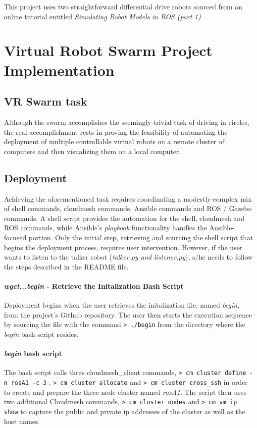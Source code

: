 \documentclass[9pt,twocolumn,twoside]{../../styles/osajnl}
\begin{document}
This project uses two straightforward differential drive robots sourced from an online tutorial entitled \textit{Simulating Robot Models in ROS (part 1)} \cite{www-mybot-moore}

\section{Virtual Robot Swarm Project Implementation}
\subsection{VR Swarm task}
Although the swarm accomplishes the seemingly-trivial task of driving in circles, the real accomplishment rests in proving the feasibility of automating the deployment of multiple controllable virtual robots on a remote cluster of computers and then visualizing them on a local computer.

\subsection{Deployment}
Achieving the aforementioned task requires coordinating a modestly-complex mix of shell commands, cloudmesh commands, Ansible commands and ROS / Gazebo commands. A shell script provides the automation for the shell, cloudmesh and ROS commands, while Ansible's \textit{playbook} functionality handles the Ansible-focused portion.  Only the initial step, retrieving and sourcing the shell script that begins the deployment process, requires user intervention.  However, if the user wants to listen to the talker robot (\textit{talker.py and listener.py}), s/he needs to follow the steps described in the README file.

\paragraph{\textit{wget...begin} - Retrieve the Initalization Bash Script}
Deployment begins when the user retrieves the initalization file, named \textit{begin}, from the project's Github repository.  The user then starts the execution sequence by sourcing the file with the command \newline
{\color{green} \lstinline[style=BashInputStyle]!> ./begin! } \newline
from the directory where the \textit{begin} bash script resides.  

\paragraph{\textit{begin} bash script}
The bash script calls three cloudmesh\_client commands, {\color{green} \lstinline[style=BashInputStyle]!> cm cluster define -n rosA1 -c 3! }, {\color{green} \lstinline[style=BashInputStyle]!> cm cluster allocate! } and {\color{green} \lstinline[style=BashInputStyle]!> cm cluster cross_ssh! } in order to create and prepare the three-node cluster named \textit{rosA1}.  The script then uses two additional Cloudmesh commands, {\color{green} \lstinline[style=BashInputStyle]!> cm cluster nodes! } and {\color{green} \lstinline[style=BashInputStyle]!> cm vm ip show! } to capture the public and private ip addresses of the cluster as well as the host names.  
\end{document}
